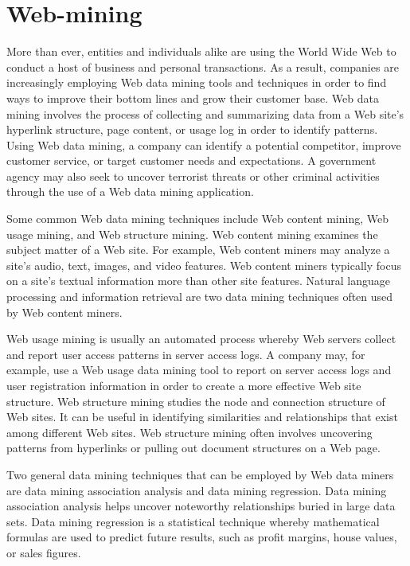 
\maketitle

\section{Web-mining}




More than ever, entities and individuals alike are using the World Wide Web to conduct a host of business and personal transactions. As a result, companies are increasingly employing Web data mining tools and techniques in order to find ways to improve their bottom lines and grow their customer base. Web data mining involves the process of collecting and summarizing data from a Web site’s hyperlink structure, page content, or usage log in order to identify patterns. Using Web data mining, a company can identify a potential competitor, improve customer service, or target customer needs and expectations. A government agency may also seek to uncover terrorist threats or other criminal activities through the use of a Web data mining application.

 

Some common Web data mining techniques include Web content mining, Web usage mining, and Web structure mining. Web content mining examines the subject matter of a Web site. For example, Web content miners may analyze a site's audio, text, images, and video features. Web content miners typically focus on a site’s textual information more than other site features. Natural language processing and information retrieval are two data mining techniques often used by Web content miners.

 

Web usage mining is usually an automated process whereby Web servers collect and report user access patterns in server access logs. A company may, for example, use a Web usage data mining tool to report on server access logs and user registration information in order to create a more effective Web site structure. Web structure mining studies the node and connection structure of Web sites. It can be useful in identifying similarities and relationships that exist among different Web sites. Web structure mining often involves uncovering patterns from hyperlinks or pulling out document structures on a Web page.

 

Two general data mining techniques that can be employed by Web data miners are data mining association analysis and data mining regression. Data mining association analysis helps uncover noteworthy relationships buried in large data sets. Data mining regression is a statistical technique whereby mathematical formulas are used to predict future results, such as profit margins, house values, or sales figures.

